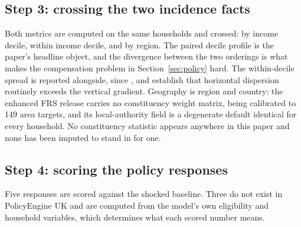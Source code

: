 \subsection{Step 3: crossing the two incidence facts}
\label{sec:step3}

Both metrics are computed on the same households and crossed: by income decile, within income decile, and by region. The paired decile profile is the paper's headline object, and the divergence between the two orderings is what makes the compensation problem in Section~\ref{sec:policy} hard. The within-decile spread is reported alongside, since \citet{cronin2019}, \citet{douenne2020} and \citet{sallee2019} establish that horizontal dispersion routinely exceeds the vertical gradient. Geography is region and country: the enhanced FRS release carries no constituency weight matrix, being calibrated to 149 area targets, and its local-authority field is a degenerate default identical for every household. No constituency statistic appears anywhere in this paper and none has been imputed to stand in for one.

\subsection{Step 4: scoring the policy responses}
\label{sec:step4}

Five responses are scored against the shocked baseline. Three do not exist in PolicyEngine UK and are computed from the model's own eligibility and household variables, which determines what each scored number means.


